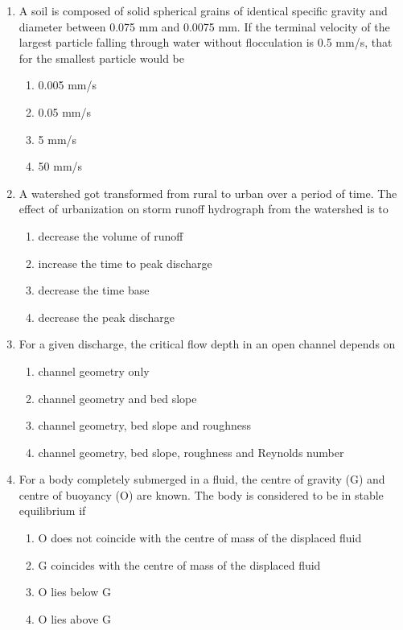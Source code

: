 \documentclass[journal,12pt,onecolumn]{IEEEtran}
\theoremstyle{remark}
\begin{document}
\begin{enumerate}
\item A soil is composed of solid spherical grains of identical specific gravity and diameter between 0.075 mm and 0.0075 mm. If the terminal velocity of the largest particle falling through water without flocculation is 0.5 mm/s, that for the smallest particle would be

\hfill{}
\begin{enumerate}
\item 0.005 mm/s
\item 0.05 mm/s
\item 5 mm/s
\item 50 mm/s
\end{enumerate}

\item A watershed got transformed from rural to urban over a period of time. The effect of urbanization on storm runoff hydrograph from the watershed is to

\hfill{}
\begin{enumerate}
\item decrease the volume of runoff
\item increase the time to peak discharge
\item decrease the time base
\item decrease the peak discharge
\end{enumerate}

\item For a given discharge, the critical flow depth in an open channel depends on

\hfill{}
\begin{enumerate}
\item channel geometry only
\item channel geometry and bed slope
\item channel geometry, bed slope and roughness
\item channel geometry, bed slope, roughness and Reynolds number
\end{enumerate}

\item For a body completely submerged in a fluid, the centre of gravity (G) and centre of buoyancy (O) are known. The body is considered to be in stable equilibrium if

\hfill{}
\begin{enumerate}
\item O does not coincide with the centre of mass of the displaced fluid
\item G coincides with the centre of mass of the displaced fluid
\item O lies below G
\item O lies above G
\end{enumerate}


\end{enumerate}
\end{document}
